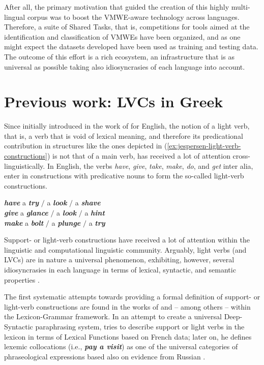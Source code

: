 \documentclass[output=paper,colorlinks,citecolor=brown]{langscibook}
\begin{document}
After all, the primary motivation that guided the creation of this highly multi-lingual corpus was to boost the VMWE-aware technology across languages. Therefore, a suite of Shared Tasks, that is, competitions for tools aimed at the identification and classification of VMWEs have been organized, and as one might expect the datasets developed have been used as training and testing data.
The outcome of this effort is a rich ecosystem, an infrastructure that is as universal as possible taking also idiosyncrasies of each language into account.  


\section{Previous work: LVCs in Greek}
\label{sec:Background}

Since initially introduced in the work of \citet{Jespersen} for English, the notion of a light verb, that is, a verb that is void of lexical meaning, and therefore its predicational contribution in structures like the ones depicted in (\ref{ex:jespersen-light-verb-constructions}) is not that of a main verb, has received a lot of attention cross-linguistically. In English, the verbs \textit{have}, \textit{give}, \textit{take}, \textit{make}, \textit{do}, and \textit{get} inter alia, enter in constructions with predicative nouns to form the so-called light-verb constructions.

\ea
\label{ex:jespersen-light-verb-constructions}
\settowidth {} 
\textbf{\em{have}} a \textbf{\em{try}} $/$ a \textbf{\em{look}} $/$ a \textbf{\em{shave}}\\
\textbf{\em{give}} a \textbf{\em{glance}} $/$ a \textbf{\em{look}} $/$ a \textbf{\em{hint}}\\
\textbf{\em{make}} a \textbf{\em{bolt}} $/$ a \textbf{\em{plunge}} $/$ a \textbf{\em{try}}\\
\z

Support- or light-verb constructions have received a lot of attention within the linguistic and computational linguistic community. Arguably, light verbs (and LVCs) are in nature a universal phenomenon, exhibiting, however, several idiosyncrasies in each language in terms of lexical, syntactic, and semantic properties \citep{grimshaw1988light, Butt2003TheLV, Butt2010}. 


The first systematic attempts towards providing a formal definition of support- or light-verb constructions are found in the works of \citet{gross_1982} and \citet{Giry-Schneider-1987} -- among others -- within the Lexicon-Grammar framework. In an attempt to create a universal Deep-Syntactic paraphrasing system, \citet{melcuk-1982, melcuk-1996, melcuk-2004} tries to describe support or light verbs in the lexicon in terms of Lexical Functions based on French data; later on, he defines lexemic collocations (i.e., \textit{\textbf{pay a visit}}) as one of the universal categories of phraseological expressions based also on evidence from Russian \citep{melcuk-2023}.
\end{document}

